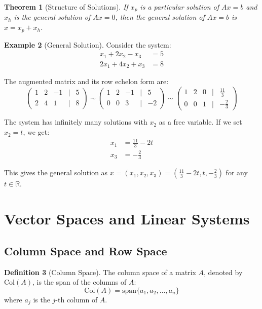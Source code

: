 \documentclass[12pt,a4paper]{article}
\theoremstyle{plain}
\newtheorem{theorem}{Theorem}[section]
\theoremstyle{definition}
\newtheorem{definition}[theorem]{Definition}
\newtheorem{example}[theorem]{Example}
\begin{document}
\begin{theorem}[Structure of Solutions]
If $x_p$ is a particular solution of $Ax = b$ and $x_h$ is the general solution of $Ax = 0$, then the general solution of $Ax = b$ is $x = x_p + x_h$.
\end{theorem}

\begin{example}[General Solution]
Consider the system:
\begin{align}
x_1 + 2x_2 - x_3 &= 5 \\
2x_1 + 4x_2 + x_3 &= 8
\end{align}

The augmented matrix and its row echelon form are:
\begin{equation}
\begin{pmatrix}
1 & 2 & -1 & | & 5 \\
2 & 4 & 1 & | & 8
\end{pmatrix} \sim
\begin{pmatrix}
1 & 2 & -1 & | & 5 \\
0 & 0 & 3 & | & -2
\end{pmatrix} \sim
\begin{pmatrix}
1 & 2 & 0 & | & \frac{11}{3} \\
0 & 0 & 1 & | & -\frac{2}{3}
\end{pmatrix}
\end{equation}

The system has infinitely many solutions with $x_2$ as a free variable. If we set $x_2 = t$, we get:
\begin{align}
x_1 &= \frac{11}{3} - 2t \\
x_3 &= -\frac{2}{3}
\end{align}

This gives the general solution as $x = (x_1, x_2, x_3) = (\frac{11}{3} - 2t, t, -\frac{2}{3})$ for any $t \in \mathbb{R}$.
\end{example}

\section{Vector Spaces and Linear Systems}

\subsection{Column Space and Row Space}

\begin{definition}[Column Space]
The column space of a matrix $A$, denoted by $\text{Col}(A)$, is the span of the columns of $A$:
\begin{equation}
\text{Col}(A) = \text{span}\{a_1, a_2, \ldots, a_n\}
\end{equation}
where $a_j$ is the $j$-th column of $A$.
\end{definition}
\end{document}
